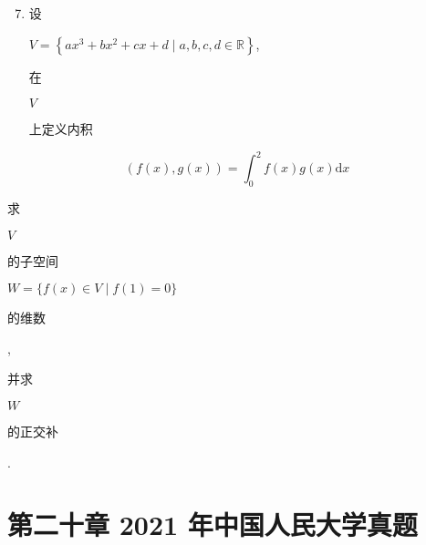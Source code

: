 \documentclass[10pt]{article}
\begin{document}
\begin{enumerate}
  \setcounter{enumi}{6}
  \item \begin{CJK}{UTF8}{mj}设\end{CJK} $V=\left\{a x^{3}+b x^{2}+c x+d \mid a, b, c, d \in \mathbb{R}\right\}$, \begin{CJK}{UTF8}{mj}在\end{CJK} $V$ \begin{CJK}{UTF8}{mj}上定义内积\end{CJK}
\end{enumerate}
$$
(f(x), g(x))=\int_{0}^{2} f(x) g(x) \mathrm{d} x
$$
\begin{CJK}{UTF8}{mj}求\end{CJK} $V$ \begin{CJK}{UTF8}{mj}的子空间\end{CJK} $W=\{f(x) \in V \mid f(1)=0\}$ \begin{CJK}{UTF8}{mj}的维数\end{CJK}, \begin{CJK}{UTF8}{mj}并求\end{CJK} $W$ \begin{CJK}{UTF8}{mj}的正交补\end{CJK}.

\section{第二十章 2021 年中国人民大学真题}
\end{document}
